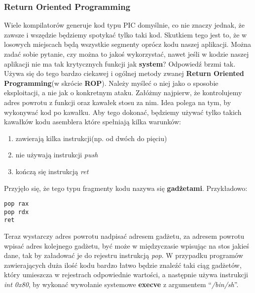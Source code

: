 \documentclass[polish]{kbk}
\begin{document}
\subsubsection{Return Oriented Programming}
Wiele kompilatorów generuje kod typu PIC domyślnie, co nie znaczy jednak, że zawsze i wszędzie będziemy spotykać tylko taki kod. Skutkiem tego jest to, że w losowych miejscach będą wszystkie segmenty oprócz kodu naszej aplikacji. Można zadać sobie pytanie, czy można to jakoś wykorzystać, nawet jeśli w kodzie naszej aplikacji nie ma tak krytycznych funkcji jak \textbf{system}? Odpowiedź brzmi tak. Używa się do tego bardzo ciekawej i ogólnej metody zwanej \textbf{Return Oriented Programming}(w skrócie \textbf{ROP}). Należy myśleć o niej jako o sposobie eksploitacji, a nie jak o konkretnym ataku. Załóżmy najpierw, że kontrolujemy adres powrotu z funkcji oraz kawałek stosu za nim. Idea polega na tym, by wykonywać kod po kawałku. Aby tego dokonać, będziemy używać tylko takich kawałków kodu asemblera które spełniają kilka warunków:
\begin{enumerate}
\item zawierają kilka instrukcji(np. od dwóch do pięciu)
\item nie używają instrukcji \emph{push}
\item kończą się instrukcją \emph{ret}
\end{enumerate}
Przyjęło się, że tego typu fragmenty kodu nazywa się \textbf{gadżetami}. Przykładowo:

\begin{lstlisting}
pop rax
pop rdx
ret
\end{lstlisting}
Teraz wystarczy adres powrotu nadpisać adresem gadżetu, za adresem powrotu wpisać adres kolejnego gadżetu, być może w międzyczasie wpisując na stos jakieś dane, tak by załadować je do rejestru instrukcją \emph{pop}. W przypadku programów zawierających duża ilość kodu bardzo łatwo będzie znaleźć taki ciąg gadżetów, który umieszcza w rejestrach odpowiednie wartości, a następnie używa instrukcji \emph{int 0x80}, by wykonać wywołanie systemowe \textbf{execve} z argumentem ``\textit{/bin/sh}''.
\end{document}
